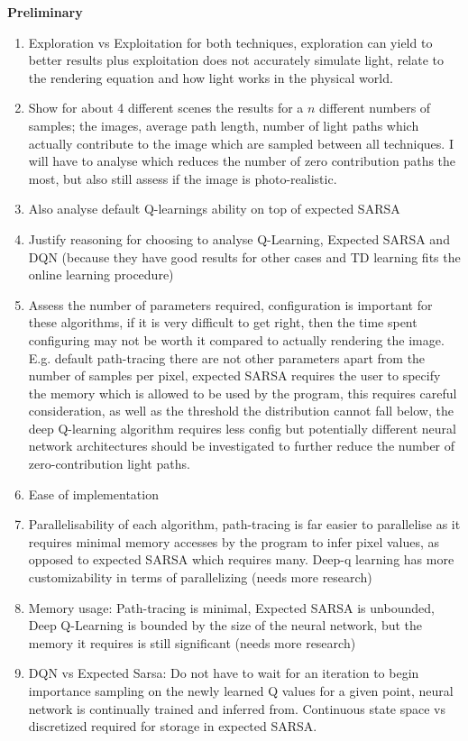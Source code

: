 \documentclass[ %
                    author={Callum Pearce},
                supervisor={Dr. Neill Campbell},
                    degree={MEng},
                     title={How effective are Temporal difference learning methods for reducing the number of zero contribution light paths while still accurately approximating Global Illumination in Path tracing?},
                  subtitle={},
                      type={research},
                      year={2019} ]{dissertation}
\begin{document}
\textbf{Preliminary}
\begin{enumerate}
\item Exploration vs Exploitation for both techniques, exploration can yield to better results plus exploitation does not accurately simulate light, relate to the rendering equation and how light works in the physical world.

\item Show for about 4 different scenes the results for a $n$ different numbers of samples; the images, average path length, number of light paths which actually contribute to the image which are sampled between all techniques. I will have to analyse which reduces the number of zero contribution paths the most, but also still assess if the image is photo-realistic.

\item Also analyse default Q-learnings ability on top of expected SARSA

\item Justify reasoning for choosing to analyse Q-Learning, Expected SARSA and DQN (because they have good results for other cases and TD learning fits the online learning procedure)

\item Assess the number of parameters required, configuration is important for these algorithms, if it is very difficult to get right, then the time spent configuring may not be worth it compared to actually rendering the image. E.g. default path-tracing there are not other parameters apart from the number of samples per pixel, expected SARSA requires the user to specify the memory which is allowed to be used by the program, this requires careful consideration, as well as the threshold the distribution cannot fall below, the deep Q-learning algorithm requires less config but potentially different neural network architectures should be investigated to further reduce the number of zero-contribution light paths. 

\item Ease of implementation 

\item Parallelisability of each algorithm, path-tracing is far easier to parallelise as it requires minimal memory accesses by the program to infer pixel values, as opposed to expected SARSA which requires many. Deep-q learning has more customizability in terms of parallelizing (needs more research)

\item Memory usage: Path-tracing is minimal, Expected SARSA is unbounded, Deep Q-Learning is bounded by the size of the neural network, but the memory it requires is still significant (needs more research)

\item DQN vs Expected Sarsa: Do not have to wait for an iteration to begin
 importance sampling on the newly learned Q values for a given point, 
 neural network is continually trained and inferred from. Continuous state 
 space vs discretized required for storage in expected SARSA.
\end{enumerate}
\end{document}
